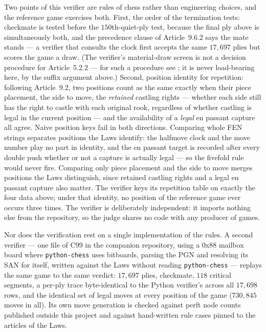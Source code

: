 \documentclass[11pt]{article}
\theoremstyle{definition}
\theoremstyle{remark}
\theoremstyle{plain}
\begin{document}
Two points of this verifier are rules of chess rather than engineering
choices, and the reference game exercises both. First, the order of the
termination tests: checkmate is tested before the $150$th-quiet-ply
test, because the final ply above is simultaneously both, and the
precedence clause of Article~9.6.2 says the mate stands --- a verifier
that consults the clock first accepts the same $17{,}697$ plies but
scores the game a draw. (The verifier's material-draw screen is not a
decision procedure for Article~5.2.2 --- for such a procedure see
\cite{ambrona2022}; it is never load-bearing here, by the suffix
argument above.) Second, position identity for repetition: following
Article~9.2, two positions count as the same exactly when their piece
placement, the side to move, the \emph{retained} castling rights ---
whether each side still has the right to castle with each original
rook, regardless of whether castling is legal in the current position
--- and the availability of a \emph{legal}
en passant capture all agree. Naive position keys fail in both
directions. Comparing whole FEN strings separates positions the Laws
identify: the halfmove clock and the move number play no part in
identity, and the en passant target is recorded after every double push
whether or not a capture is actually legal --- so the fivefold rule
would never fire. Comparing only piece placement and the side to move
merges positions the Laws distinguish, since retained castling rights
and a legal en passant capture also matter. The verifier keys its
repetition table on exactly the four data above; under that identity,
no position of the reference game ever occurs three times. The verifier
is deliberately independent: it
imports nothing else from the repository, so the judge shares no code
with any producer of games.

Nor does the verification rest on a single implementation of the rules.
A second verifier --- one file of C99 in the companion repository,
using a 0x88 mailbox board where \texttt{python-chess} uses bitboards,
parsing the PGN and resolving its SAN for itself, written against the
Laws without reading \texttt{python-chess} --- replays the same game to
the same verdict: $17{,}697$ plies, checkmate, $118$ critical segments,
a per-ply trace byte-identical to the Python verifier's across all
$17{,}698$ rows, and the identical set of legal moves at every position
of the game ($730{,}845$ moves in all). Its own move generation is
checked against perft node counts published outside this project and
against hand-written rule cases pinned to the articles of the Laws.
\end{document}
